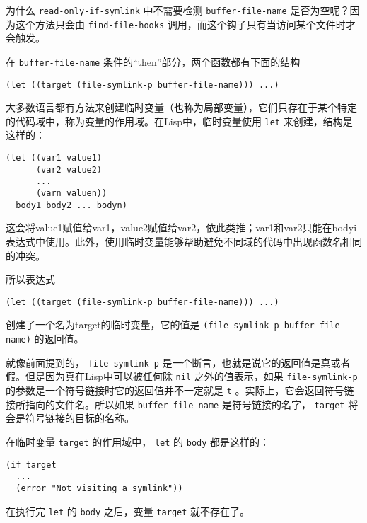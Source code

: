 为什么 \texttt{read-only-if-symlink} 中不需要检测 \texttt{buffer-file-name} 是否为空呢？因为这个方法只会由 \texttt{find-file-hooks} 调用，而这个钩子只有当访问某个文件时才会触发。

在 \texttt{buffer-file-name} 条件的“then”部分，两个函数都有下面的结构

\begin{verbatim}
(let ((target (file-symlink-p buffer-file-name))) ...)
\end{verbatim}

大多数语言都有方法来创建临时变量（也称为局部变量），它们只存在于某个特定的代码域中，称为变量的作用域。在Lisp中，临时变量使用 \texttt{let} 来创建，结构是这样的：

\begin{verbatim}
(let ((var1 value1)
      (var2 value2)
      ...
      (varn valuen))
  body1 body2 ... bodyn)
\end{verbatim}

这会将value1赋值给var1，value2赋值给var2，依此类推；var1和var2只能在bodyi表达式中使用。此外，使用临时变量能够帮助避免不同域的代码中出现函数名相同的冲突。

所以表达式

\begin{verbatim}
(let ((target (file-symlink-p buffer-file-name))) ...)
\end{verbatim}

创建了一个名为target的临时变量，它的值是 \texttt{(file-symlink-p buffer-file-name)} 的返回值。

就像前面提到的， \texttt{file-symlink-p} 是一个断言，也就是说它的返回值是真或者假。但是因为真在Lisp中可以被任何除 \texttt{nil} 之外的值表示，如果 \texttt{file-symlink-p} 的参数是一个符号链接时它的返回值并不一定就是 \texttt{t} 。实际上，它会返回符号链接所指向的文件名。所以如果 \texttt{buffer-file-name} 是符号链接的名字， \texttt{target} 将会是符号链接的目标的名称。

在临时变量 \texttt{target} 的作用域中， \texttt{let} 的 \texttt{body} 都是这样的：

\begin{verbatim}
(if target
  ...
  (error "Not visiting a symlink"))
\end{verbatim}

在执行完 \texttt{let} 的 \texttt{body} 之后，变量 \texttt{target} 就不存在了。

